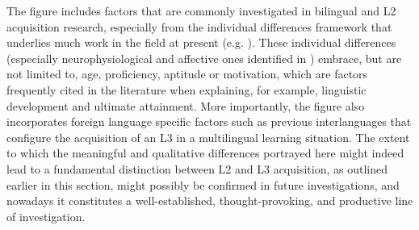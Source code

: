 \documentclass[output=paper]{../langscibook}
\begin{document}

The figure includes factors that are commonly investigated in bilingual and L2 acquisition research, especially from the individual differences framework that underlies much work in the field at present (e.g. \citealt{KiddEtAl2018}). These individual differences (especially neurophysiological and affective ones identified in ) embrace, but are not limited to, age, proficiency, aptitude or motivation, which are factors frequently cited in the literature when explaining, for example, linguistic development and ultimate attainment. More importantly, the figure also incorporates foreign language specific factors such as previous interlanguages that configure the acquisition of an L3 in a multilingual learning situation. The extent to which the meaningful and qualitative differences portrayed here might indeed lead to a fundamental distinction between L2 and L3 acquisition, as outlined earlier in this section, might possibly be confirmed in future investigations, and nowadays it constitutes a well-established, thought-provoking, and productive line of investigation.
\end{document}
